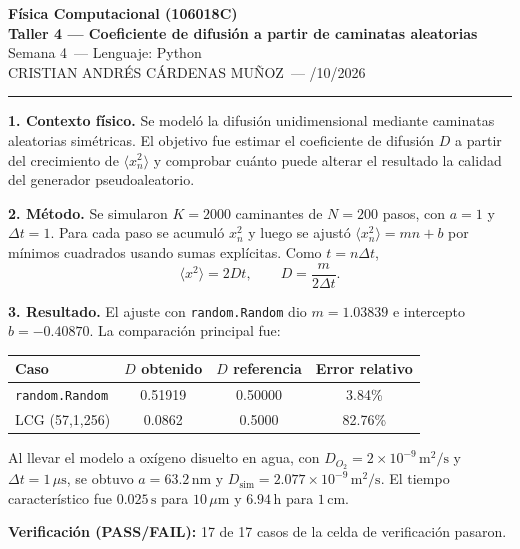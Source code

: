 \documentclass[11pt]{article}
\newcommand{\curso}{Física Computacional (106018C)}
\newcommand{\taller}{Taller 4 --- Coeficiente de difusión a partir de caminatas aleatorias}
\newcommand{\semana}{Semana 4}
\newcommand{\lenguaje}{Python}
\newcommand{\estudiante}{CRISTIAN ANDRÉS CÁRDENAS MUÑOZ}
\newcommand{\fechaentrega}{07/10/2026}
\begin{document}
\begin{center}
{\large\bfseries \curso} \\[2pt]
{\bfseries \taller} \\[2pt]
\semana\ \quad --- \quad Lenguaje: \lenguaje \\[2pt]
\estudiante\ \quad --- \quad \fechaentrega
\end{center}

\vspace{4pt}
\hrule
\vspace{6pt}

\textbf{1. Contexto físico.}
Se modeló la difusión unidimensional mediante caminatas aleatorias simétricas. El objetivo fue estimar el coeficiente de difusión $D$ a partir del crecimiento de $\langle x_n^2\rangle$ y comprobar cuánto puede alterar el resultado la calidad del generador pseudoaleatorio.

\textbf{2. Método.}
Se simularon $K=2000$ caminantes de $N=200$ pasos, con $a=1$ y $\Delta t=1$. Para cada paso se acumuló $x_n^2$ y luego se ajustó $\langle x_n^2\rangle=mn+b$ por mínimos cuadrados usando sumas explícitas. Como $t=n\Delta t$,
\begin{equation*}
\langle x^2\rangle=2Dt,\qquad D=\frac{m}{2\Delta t}.
\end{equation*}

\textbf{3. Resultado.}
El ajuste con \texttt{random.Random} dio $m=1.03839$ e intercepto $b=-0.40870$. La comparación principal fue:

\begin{center}
\begin{tabular}{lccc}
\toprule
Caso & $D$ obtenido & $D$ referencia & Error relativo \\
\midrule
\texttt{random.Random} & 0.51919 & 0.50000 & 3.84\% \\
LCG (57,1,256) & 0.0862 & 0.5000 & 82.76\% \\
\bottomrule
\end{tabular}
\end{center}

Al llevar el modelo a oxígeno disuelto en agua, con $D_{O_2}=2\times10^{-9}\,\mathrm{m^2/s}$ y $\Delta t=1\,\mu\mathrm{s}$, se obtuvo $a=63.2\,\mathrm{nm}$ y $D_{\mathrm{sim}}=2.077\times10^{-9}\,\mathrm{m^2/s}$. El tiempo característico fue $0.025\,\mathrm{s}$ para $10\,\mu\mathrm{m}$ y $6.94\,\mathrm{h}$ para $1\,\mathrm{cm}$.

\textbf{Verificación (PASS/FAIL):} 17 de 17 casos de la celda de verificación pasaron.
\end{document}
